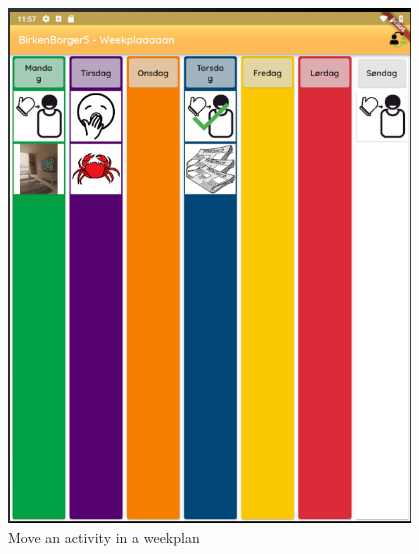 \begin{figure}[H]
    \begin{center}
        \includegraphics[width=0.95\textwidth]{figures/FinalScreen/weekplanScreenMoveActivity.png}
    \end{center}
    \caption{Move an activity in a weekplan}
    \label{fig:finalWeekplanMoveActivity}
\end{figure}

